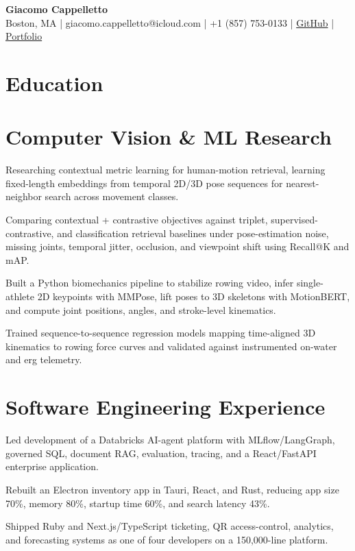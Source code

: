 \documentclass[letterpaper,10pt]{article}
\begin{document}
{\Large\textbf{Giacomo Cappelletto}}\\[-1pt]Boston, MA | giacomo.cappelletto@icloud.com | +1 (857) 753-0133 | \href{https://github.com/JJCAPPE}{GitHub} | \href{https://cv-nu-sage.vercel.app/}{Portfolio}
\section{Education}
\section{Computer Vision \& ML Research}
\bi\item Researching contextual metric learning for human-motion retrieval, learning fixed-length embeddings from temporal 2D/3D pose sequences for nearest-neighbor search across movement classes.\item Comparing contextual + contrastive objectives against triplet, supervised-contrastive, and classification retrieval baselines under pose-estimation noise, missing joints, temporal jitter, occlusion, and viewpoint shift using Recall@K and mAP.\ei
{}\bi\item Built a Python biomechanics pipeline to stabilize rowing video, infer single-athlete 2D keypoints with MMPose, lift poses to 3D skeletons with MotionBERT, and compute joint positions, angles, and stroke-level kinematics.\item Trained sequence-to-sequence regression models mapping time-aligned 3D kinematics to rowing force curves and validated against instrumented on-water and erg telemetry.\ei
\section{Software Engineering Experience}
\bi\item Led development of a Databricks AI-agent platform with MLflow/LangGraph, governed SQL, document RAG, evaluation, tracing, and a React/FastAPI enterprise application.\ei
{}\bi\item Rebuilt an Electron inventory app in Tauri, React, and Rust, reducing app size 70\%, memory 80\%, startup time 60\%, and search latency 43\%.\ei
{}\bi\item Shipped Ruby and Next.js/TypeScript ticketing, QR access-control, analytics, and forecasting systems as one of four developers on a 150,000-line platform.\ei
\end{document}
